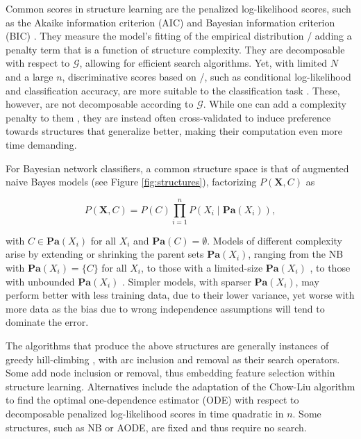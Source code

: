 Common scores in structure learning are the penalized log-likelihood
scores, such as the Akaike information criterion (AIC) \citep{Akaike74}
and Bayesian information criterion (BIC) \citep{Schwarz1978}. They
measure the model's fitting of the empirical distribution \pcxemp/
adding a penalty term that is a function of structure complexity. They
are decomposable with respect to \(\mathcal{G}\), allowing for efficient
search algorithms. Yet, with limited \(N\) and a large \(n\),
discriminative scores based on \pcgx/, such as conditional
log-likelihood and classification accuracy, are more suitable to the
classification task \citep{Friedman1997}. These, however, are not
decomposable according to \(\mathcal{G}\). While one can add a
complexity penalty to them \citep[e.g.,][]{grossman2004}, they are
instead often cross-validated to induce preference towards structures
that generalize better, making their computation even more time
demanding.

For Bayesian network classifiers, a common \citep[see][]{Bielza14}
structure space is that of augmented naive Bayes \citep{Friedman1997}
models (see Figure \ref{fig:structures}), factorizing
\(P(\mathbf{X}, C)\) as

\begin{equation}
P(\mathbf{X}, C) = P(C) \prod_{i=1}^{n} P(X_i \mid \mathbf{Pa}(X_i)), \label{eq:augnb}
\end{equation}

\noindent with \(C \in \mathbf{Pa}(X_i)\) for all \(X_i\) and
\(\mathbf{Pa}(C) = \emptyset\). Models of different complexity arise by
extending or shrinking the parent sets \(\mathbf{Pa}(X_i)\), ranging
from the NB \citep{Minsky1961} with \(\mathbf{Pa}(X_i) = \{C \}\) for
all \(X_i\), to those with a limited-size \(\mathbf{Pa}(X_i)\)
\citep{Friedman1997,Sahami1996}, to those with unbounded
\(\mathbf{Pa}(X_i)\) \citep{Pernkopf2003}. Simpler models, with sparser \(\mathbf{Pa}(X_i)\), may perform better with less
training data, due to their lower variance, yet worse with more data as
the bias due to wrong independence assumptions will tend to dominate the
error.

The algorithms that produce the above structures are generally instances
of greedy hill-climbing \citep{Keogh2002,Sahami1996}, with arc inclusion
and removal as their search operators. Some \citep[e.g.,][]{Pazzani1996}
add node inclusion or removal, thus embedding feature selection
\citep{Guyon2003} within structure learning. Alternatives include the
adaptation \citep{Friedman1997} of the Chow-Liu \citep{Chow1968}
algorithm to find the optimal one-dependence estimator (ODE) with
respect to decomposable penalized log-likelihood scores in time
quadratic in \(n\). Some structures, such as NB or AODE, are fixed and
thus require no search.

